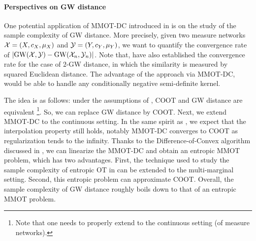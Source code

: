 
\paragraph{Perspectives on GW distance} One potential application of MMOT-DC introduced
in  is on the study of the sample complexity of GW distance.
More precisely, given two measure networks $\mathcal X = (X, c_X, \mu_X)$ and $\mathcal Y = (Y, c_Y, \mu_Y)$,
we want to quantify the convergence rate of $|\text{GW}(\mathcal X, \mathcal Y) - \text{GW}(\mathcal X_n, \mathcal Y_n)|$.
Note that, \cite{Zhang23} have also established the convergence rate for the case of $2$-GW distance,
in which the similarity is measured by squared Euclidean distance.
The advantage of the approach via MMOT-DC, would be able to handle any
conditionally negative semi-definite kernel.

The idea is as follows: under the assumptions of ,
COOT and GW distance are equivalent
\footnote{Note that one needs to properly extend  to the continuous setting
(of measure networks).}. So, we can replace GW distance by COOT.
Next, we extend MMOT-DC to the continuous setting. In the same spirit as ,
we expect that the interpolation property still holds,
notably MMOT-DC converges to COOT as regularization tends to the infinity.
Thanks to the Difference-of-Convex algorithm discussed in ,
we can linearize the MMOT-DC and obtain an entropic MMOT problem, which has two advantages.
First, the technique used to study the sample complexity of entropic OT in \citep{Genevay19}
can be extended to the multi-marginal setting. Second, this entropic problem can approximate COOT.
Overall, the sample complexity of GW distance roughly boils down to that of an entropic MMOT problem.

